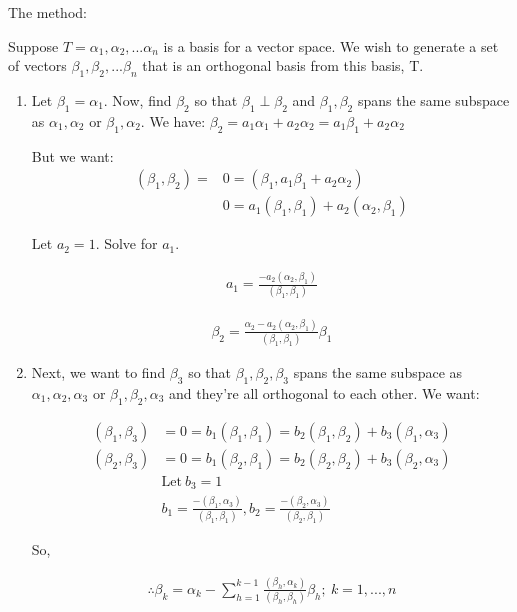 The method:

Suppose $T = {\alpha_1, \alpha_2, ... \alpha_n}$ is a basis for a vector space. We wish to generate a set of vectors ${\beta_1, \beta_2, ... \beta_n}$ that is an orthogonal basis from this basis, T.

\begin{enumerate}
  \item Let $\beta_1 = \alpha_1$. Now, find $\beta_2$ so that $\beta_1 \perp \beta_2$ and $\beta_1, \beta_2$ spans the same subspace as ${\alpha_1, \alpha_2}$ or ${\beta_1, \alpha_2}$. We have: $\beta_2 = a_1\alpha_1 + a_2\alpha_2 = a_1\beta_1 + a_2\alpha_2$

  But we want:
  \begin{align*}
    (\beta_1, \beta_2) = &0 = (\beta_1, a_1\beta_1 + a_2\alpha_2) \\ 
                         &0 = a_1(\beta_1, \beta_1) + a_2(\alpha_2, \beta_1)
  \end{align*}

  Let $a_2 = 1$. Solve for $a_1$.

  \begin{align*}
    a_1 = \frac{-a_2(\alpha_2, \beta_1)}{(\beta_1, \beta_1)}
  \end{align*}

  \begin{align*}
    \beta_2 = \frac{\alpha_2 - a_2(\alpha_2, \beta_1)}{(\beta_1, \beta_1)} \beta_1
  \end{align*}

  \item Next, we want to find $\beta_3$ so that ${\beta_1, \beta_2, \beta_3}$ spans the same subspace as ${\alpha_1, \alpha_2, \alpha_3}$ or ${\beta_1, \beta_2, \alpha_3}$ and they're all orthogonal to each other. We want:

  \begin{align*}
    (\beta_1, \beta_3) &= 0 = b_1(\beta_1, \beta_1) = b_2(\beta_1, \beta_2) + b_3(\beta_1, \alpha_3) \\
    (\beta_2, \beta_3) &= 0 = b_1(\beta_2, \beta_1) = b_2(\beta_2, \beta_2) + b_3(\beta_2, \alpha_3) \\
                       &\text{Let}\ b_3 = 1 \\
                       &b_1 = \frac{-(\beta_1, \alpha_3)}{(\beta_1, \beta_1)}, b_2 = \frac{-(\beta_2, \alpha_3)}{(\beta_2, \beta_1)}
  \end{align*}

  So,

  \begin{align*}
    \therefore \beta_k = \alpha_k - \sum_{h=1}^{k-1} \frac{(\beta_h, \alpha_k)}{(\beta_h, \beta_h)} \beta_h;\ k = 1, ..., n
  \end{align*}


\end{enumerate}
